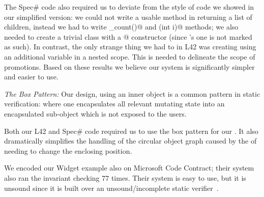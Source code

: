 




The Spec\# code also required us to deviate from the style of code we showed in our simplified version: we could not write a usable \Q@children@ method in \Q@Widget@ returning a list of children, instead we had to write \Q@children_count()@ and \Q@children(int i)@ methods; we also needed to create a trivial class with a \Q@[Pure]@ constructor (since \Q@Object@'s one is not marked as such). In contrast, the only strange thing we had to in L42 was creating \Q@Box@es using 
an additional variable in a nested scope.
This is needed to delineate the scope of promotions.
Based on these results we believe our system is significantly simpler and easier to use.

\textit{The Box Pattern:}
Our design, using an inner \Q@Box@ object is a common pattern in static verification: where one encapsulates all relevant mutating state into an encapsulated sub-object which is not exposed to the users.

Both our L42 and Spec\# code required us to use the box pattern for our \Q@SafeMovable@. It also dramatically simplifies the handling of the circular object graph caused by the \Q@Action@s of \Q@Button@s needing to change the enclosing \Q@SafeMovable@s position.

 We encoded our Widget example also on Microsoft Code Contract; their system also ran the invariant checking $77$ times. Their system is easy to use, but it is unsound since it is built over an unsound/incomplete static verifier~\cite{?}.


